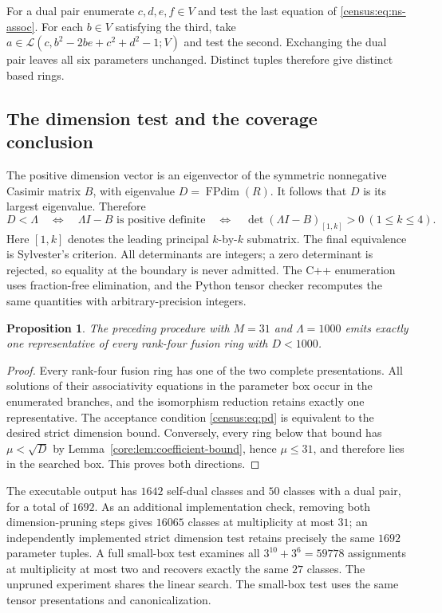 \documentclass[11pt,a4paper]{article}
\newtheorem{proposition}[theorem]{Proposition}
\theoremstyle{definition}\newtheorem{definition}[theorem]{Definition}
\theoremstyle{remark}\newtheorem{remark}[theorem]{Remark}
\DeclareMathOperator{\FPdim}{FPdim}
\numberwithin{equation}{section}
\begin{document}
For a dual pair enumerate $c,d,e,f\in V$ and test the last equation of
\eqref{census:eq:ns-assoc}. For each $b\in V$ satisfying the third,
take $a\in\mathcal L(c,b^2-2be+c^2+d^2-1;V)$ and test the second.
Exchanging the dual pair leaves all six parameters unchanged. Distinct
tuples therefore give distinct based rings.

\subsection{The dimension test and the coverage conclusion}
The positive dimension vector is an eigenvector of the symmetric
nonnegative Casimir matrix $B$, with eigenvalue $D=\FPdim(R)$.
It follows that $D$ is its largest eigenvalue. Therefore
\begin{equation}\label{census:eq:pd}
 D<\Lambda\quad\Longleftrightarrow\quad
 \Lambda I-B\text{ is positive definite}
 \quad\Longleftrightarrow\quad
 \det(\Lambda I-B)_{[1,k]}>0\ (1\leq k\leq4).
\end{equation}
Here $[1,k]$ denotes the leading principal $k$-by-$k$ submatrix.
The final equivalence is Sylvester's criterion. All determinants are
integers; a zero determinant is rejected, so equality at the boundary
is never admitted. The C++ enumeration uses fraction-free elimination,
and the Python tensor checker recomputes the same quantities with
arbitrary-precision integers.

\begin{proposition}\label{census:prop:coverage}
The preceding procedure with $M=31$ and $\Lambda=1000$ emits exactly
one representative of every rank-four fusion ring with $D<1000$.
\end{proposition}
\begin{proof}
Every rank-four fusion ring has one of the two complete presentations.
All solutions of their associativity equations in the parameter box
occur in the enumerated branches, and the isomorphism reduction retains
exactly one representative. The acceptance condition
\eqref{census:eq:pd} is equivalent to the desired strict dimension
bound. Conversely, every ring below that bound has $\mu<\sqrt D$
by Lemma~\ref{core:lem:coefficient-bound}, hence $\mu\leq31$, and therefore
lies in the searched box. This proves both directions.
\end{proof}

The executable output has $1642$ self-dual classes and
$50$ classes with a dual pair, for a total of $1692$.
As an additional implementation check, removing both dimension-pruning
steps gives $16065$ classes at multiplicity at most $31$; an independently
implemented strict dimension test retains precisely the same $1692$
parameter tuples. A full small-box test examines all
$3^{10}+3^6=59778$ assignments at multiplicity at most two and recovers
exactly the same $27$ classes. The unpruned experiment shares the
linear search. The small-box test uses the same
tensor presentations and canonicalization.
\end{document}
